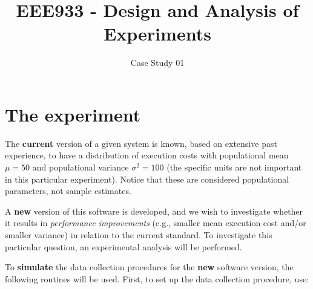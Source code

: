 \documentclass[letter,11pt,twoside,printwatermark=false]{pinp}
\title{EEE933 - Design and Analysis of Experiments}
\author[]{Case Study 01}
\begin{document}
\verticaladjustment{-2pt}

\maketitle
\thispagestyle{firststyle}



\section{The experiment}\label{the-experiment}

The \textbf{current} version of a given system is known, based on
extensive past experience, to have a distribution of execution costs
with populational mean \(\mu = 50\) and populational variance
\(\sigma^2 = 100\) (the specific units are not important in this
particular experiment). Notice that these are considered populational
parameters, not sample estimates.

A \textbf{new} version of this software is developed, and we wish to
investigate whether it results in \emph{performance improvements} (e.g.,
smaller mean execution cost and/or smaller variance) in relation to the
current standard. To investigate this particular question, an
experimental analysis will be performed.

To \textbf{simulate} the data collection procedures for the \textbf{new}
software version, the following routines will be used. First, to set up
the data collection procedure, use:

\begin{Shaded}
\begin{Highlighting}[]
\NormalTok{(}\NormalTok{) }
\end{Highlighting}
\end{Shaded}
\end{document}
